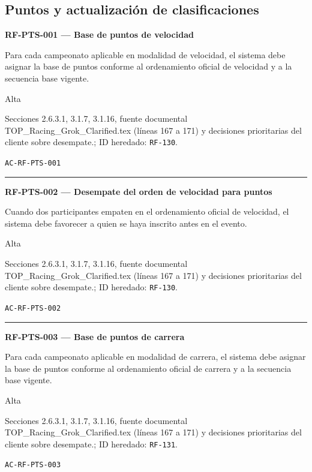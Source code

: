 \documentclass[10pt,letterpaper]{article}
\begin{document}
\subsection{Puntos y actualización de clasificaciones}
\noindent\textbf{RF-PTS-001 --- Base de puntos de velocidad}\par
\begin{description}[style=nextline,leftmargin=3.15cm,labelwidth=2.8cm,font=\normalfont\bfseries]
\item[Obligación] Para cada campeonato aplicable en modalidad de velocidad, el sistema debe asignar la base de puntos conforme al ordenamiento oficial de velocidad y a la secuencia base vigente.
\item[Prioridad] Alta
\item[Procedencia] Secciones 2.6.3.1, 3.1.7, 3.1.16, fuente documental TOP\_Racing\_Grok\_Clarified.tex (líneas 167 a 171) y decisiones prioritarias del cliente sobre desempate.; ID heredado: \texttt{RF-130}.
\item[Verificación] \texttt{AC-RF-PTS-001}
\end{description}
\vspace{0.25em}\hrule\vspace{0.65em}
\noindent\textbf{RF-PTS-002 --- Desempate del orden de velocidad para puntos}\par
\begin{description}[style=nextline,leftmargin=3.15cm,labelwidth=2.8cm,font=\normalfont\bfseries]
\item[Obligación] Cuando dos participantes empaten en el ordenamiento oficial de velocidad, el sistema debe favorecer a quien se haya inscrito antes en el evento.
\item[Prioridad] Alta
\item[Procedencia] Secciones 2.6.3.1, 3.1.7, 3.1.16, fuente documental TOP\_Racing\_Grok\_Clarified.tex (líneas 167 a 171) y decisiones prioritarias del cliente sobre desempate.; ID heredado: \texttt{RF-130}.
\item[Verificación] \texttt{AC-RF-PTS-002}
\end{description}
\vspace{0.25em}\hrule\vspace{0.65em}
\noindent\textbf{RF-PTS-003 --- Base de puntos de carrera}\par
\begin{description}[style=nextline,leftmargin=3.15cm,labelwidth=2.8cm,font=\normalfont\bfseries]
\item[Obligación] Para cada campeonato aplicable en modalidad de carrera, el sistema debe asignar la base de puntos conforme al ordenamiento oficial de carrera y a la secuencia base vigente.
\item[Prioridad] Alta
\item[Procedencia] Secciones 2.6.3.1, 3.1.7, 3.1.16, fuente documental TOP\_Racing\_Grok\_Clarified.tex (líneas 167 a 171) y decisiones prioritarias del cliente sobre desempate.; ID heredado: \texttt{RF-131}.
\item[Verificación] \texttt{AC-RF-PTS-003}
\end{description}
\end{document}
